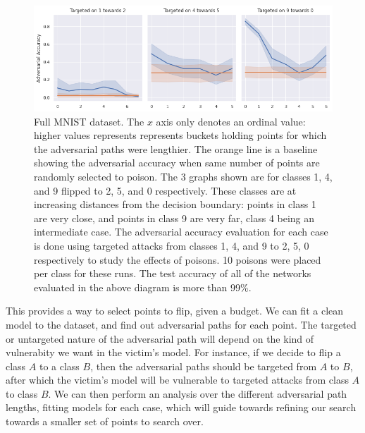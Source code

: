 \documentclass{ociamthesis}
\begin{document}
    \begin{figure}[!h]
        \centering
        \includegraphics[scale=0.5]{targeted-mnist-pgd-path-trick.png}
        \caption{Full MNIST dataset. The $x$ axis only denotes an ordinal value:
        higher values represents represents buckets holding points for which the
        adversarial paths were lengthier. The orange line is a baseline showing
        the adversarial accuracy when same number of points are randomly
        selected to poison. The 3 graphs shown are for classes 1, 4, and 9
        flipped to 2, 5, and 0 respectively. These classes are at increasing
        distances from the decision boundary: points in class 1 are very close,
        and points in class 9 are very far, class 4 being an intermediate case.
        The adversarial accuracy evaluation for each case is done using targeted
        attacks from classes 1, 4, and 9 to 2, 5, 0 respectively to study the
        effects of poisons. 10 poisons were placed per class for these runs. The
        test accuracy of all of the networks evaluated in the above diagram is
        more than 99\%.}
        \label{fig:full-MNIST-curve}
    \end{figure}


This provides a way to select points to flip, given a budget. We can fit a clean
model to the dataset, and find out adversarial paths for each point. The
targeted or untargeted nature of the adversarial path will depend on the kind of
vulnerabity we want in the victim's model. For instance, if we decide to flip a
class $A$ to a class $B$, then the adversarial paths should be targeted from $A$
to $B$, after which the victim's model will be vulnerable to targeted attacks
from class $A$ to class $B$. We can then perform an analysis over the different
adversarial path lengths, fitting models for each case, which will guide towards
refining our search towards a smaller set of points to search over.
\end{document}
